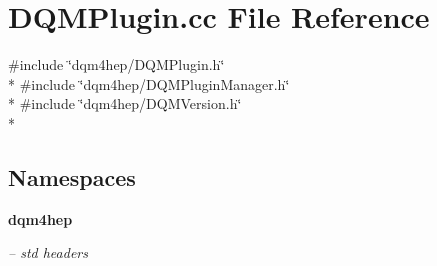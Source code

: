 \section{D\+Q\+M\+Plugin.\+cc File Reference}
\label{DQMPlugin_8cc}
{\ttfamily \#include \char`\"{}dqm4hep/\+D\+Q\+M\+Plugin.\+h\char`\"{}}\\*
{\ttfamily \#include \char`\"{}dqm4hep/\+D\+Q\+M\+Plugin\+Manager.\+h\char`\"{}}\\*
{\ttfamily \#include \char`\"{}dqm4hep/\+D\+Q\+M\+Version.\+h\char`\"{}}\\*
\subsection*{Namespaces}
\begin{DoxyCompactItemize}
\item 
 {\bf dqm4hep}
\begin{DoxyCompactList}\small\item\em -- std headers \end{DoxyCompactList}\end{DoxyCompactItemize}
